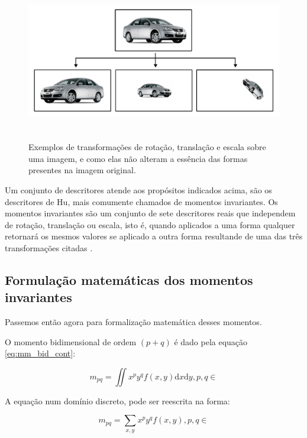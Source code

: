 \begin{figure}[H]
  \begin{center}
    \includegraphics[height=7cm]{imagens/carros_transformados.pdf}
  \end{center}
  \caption{ Exemplos de transformações de rotação, translação e escala sobre
    uma imagem, e como elas não alteram a essência das formas presentes na
    imagem original. }
  \label{fig:carros_transformados}
\end{figure}

Um conjunto de descritores atende aos propósitos indicados acima, são os
descritores de Hu, mais comumente chamados de momentos invariantes. Os momentos
invariantes são um conjunto de sete descritores reais que independem de rotação,
translação ou escala, isto é, quando aplicados a uma forma qualquer retornará
os mesmos valores se aplicado a outra forma resultande de uma das três
transformações citadas \cite{AnalysisofHusMoment}.

\subsection{Formulação matemáticas dos momentos invariantes}\label{sec:momentos_mat}

Passemos então agora para formalização matemática desses momentos.

O momento bidimensional de ordem $ (p+q) $ é dado pela
equação \ref{eq:mm_bid_cont}:

\begin{equation}\label{eq:mm_bid_cont}
m_{pq} = \iint x^p y^q f(x, y) \mathrm{d}x \mathrm{d}y, p, q \in
\end{equation}

A equação num domínio discreto, pode ser reescrita na forma:

\begin{equation}\label{eq:mm_bid_disc}
m_{pq} = \sum_{x, y} x^p y^q f(x, y), p, q \in
\end{equation}

